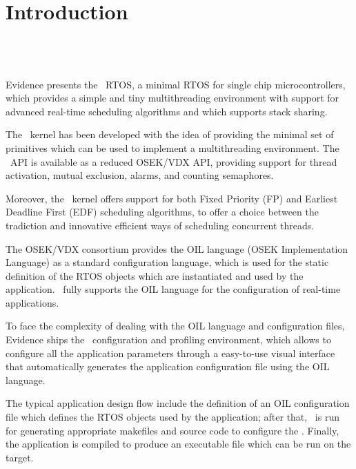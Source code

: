 \chapter{Introduction}

\section{\ee\ }
Evidence presents the \ee\ RTOS, a minimal RTOS for single
chip microcontrollers, which provides a simple and tiny multithreading
environment with support for advanced real-time scheduling algorithms
and which supports stack sharing.

The \ee\ kernel has been developed with the idea of providing the
minimal set of primitives which can be used to implement a
multithreading environment. The \ee\ API is available as a reduced OSEK/VDX API,
providing support for thread activation, mutual exclusion, alarms, and 
counting semaphores.

Moreover, the \ee\ kernel offers support for both Fixed Priority (FP)
and Earliest Deadline First (EDF) scheduling algorithms, to offer a
choice between the tradiction and innovative efficient ways of
scheduling concurrent threads.

The OSEK/VDX consortium provides the OIL language (OSEK Implementation 
Language) as a standard configuration language, which is used for the 
static definition of the RTOS objects which are instantiated and used 
by the application. \ee\ fully supports the OIL language for the 
configuration of real-time applications.

To face the complexity of dealing with the OIL language and 
configuration files, Evidence ships the \rtd\ configuration and 
profiling environment, which allows to configure all the application 
parameters through a easy-to-use visual interface that automatically 
generates the application configuration file using the OIL language. 

The typical application design flow include the definition of an OIL 
configuration file which defines the RTOS objects used by the 
application; after that, \rtd\ is run for generating appropriate makefiles 
and source code to configure the \ee. Finally, the application is 
compiled to produce an executable file which can be run on the target. 

